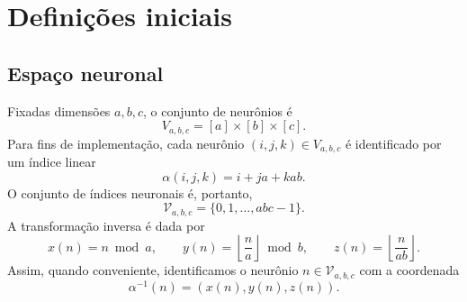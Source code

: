 \documentclass[12pt,a4paper,fleqn]{article}
\begin{document}
\section{Definições iniciais}

\subsection{Espaço neuronal}

Fixadas dimensões $a,b,c$, o conjunto de neurônios é
$$
	V_{a,b,c} = [a] \times [b] \times [c].
$$
Para fins de implementação, cada neurônio $(i,j,k) \in V_{a,b,c}$ é identificado por um índice linear
$$
	\alpha(i,j,k) = i + ja + kab.
$$
O conjunto de índices neuronais é, portanto,
$$
	\mathcal{V}_{a,b,c} = \{0,1,\ldots,abc-1\}.
$$
A transformação inversa é dada por
$$
	x(n)= n \bmod a,\qquad
	y(n)= \left\lfloor\frac{n}{a}\right\rfloor \bmod b,\qquad
	z(n)= \left\lfloor\frac{n}{ab}\right\rfloor.
$$
Assim, quando conveniente, identificamos o neurônio $n \in \mathcal{V}_{a,b,c}$ com a coordenada
$$
	\alpha^{-1}(n) = (x(n),y(n),z(n)).
$$
\end{document}
